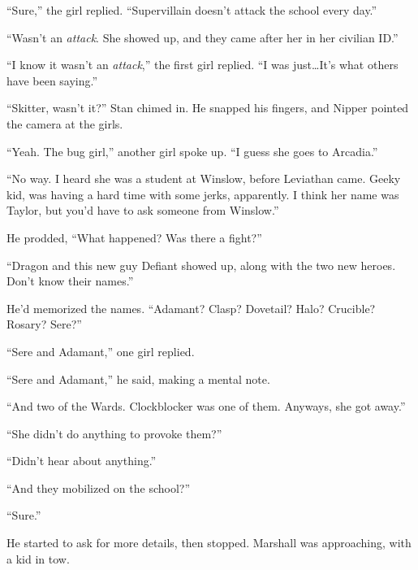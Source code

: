 ``Sure,'' the girl replied.  ``Supervillain doesn't attack the school every day.''



``Wasn't an \emph{attack}.  She showed up, and they came after her in her civilian ID.''



``I know it wasn't an \emph{attack},'' the first girl replied.  ``I was just\ldots It's what others have been saying.''



``Skitter, wasn't it?''  Stan chimed in.  He snapped his fingers, and Nipper pointed the camera at the girls.



``Yeah.  The bug girl,'' another girl spoke up.  ``I guess she goes to Arcadia.''



``No way.  I heard she was a student at Winslow, before Leviathan came.  Geeky kid, was having a hard time with some jerks, apparently.  I think her name was Taylor, but you'd have to ask someone from Winslow.''



He prodded, ``What happened?  Was there a fight?''



``Dragon and this new guy Defiant showed up, along with the two new heroes.  Don't know their names.''



He'd memorized the names.  ``Adamant?  Clasp?  Dovetail?  Halo?  Crucible? Rosary? Sere?''



``Sere and Adamant,'' one girl replied.



``Sere and Adamant,'' he said, making a mental note.



``And two of the Wards.  Clockblocker was one of them.  Anyways, she got away.''



``She didn't do anything to provoke them?''



``Didn't hear about anything.''



``And they mobilized on the school?''



``Sure.''



He started to ask for more details, then stopped.  Marshall was approaching, with a kid in tow.



